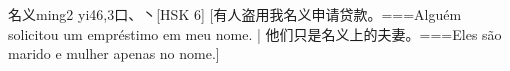 \begin{EntryWithPhonetic}{名义}{ming2 yi4}{6,3}{⼝、⼂}[HSK 6]
  [有人盗用我名义申请贷款。===Alguém solicitou um empréstimo em meu nome. | 他们只是名义上的夫妻。===Eles são marido e mulher apenas no nome.]
\end{EntryWithPhonetic}

